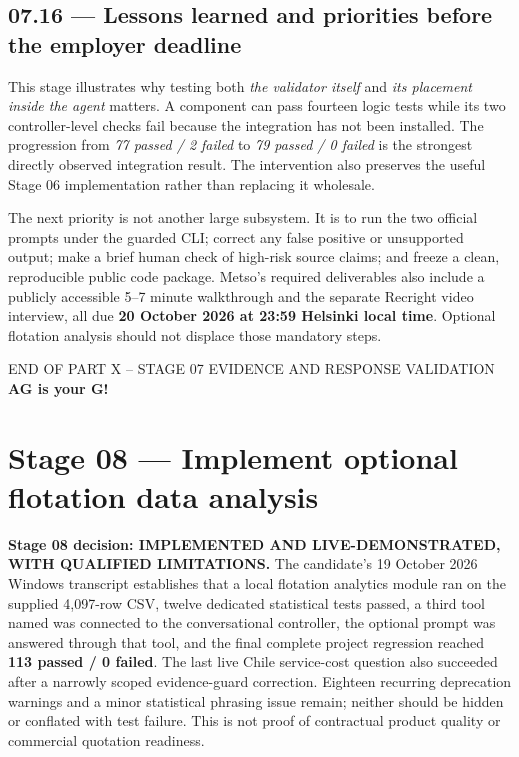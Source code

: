 \documentclass[11pt,a4paper]{article}
\DeclareRobustCommand{\code}[1]{{\ttfamily\small\detokenize{#1}}}
\begin{document}
\subsection{07.16 --- Lessons learned and priorities before the employer deadline}
This stage illustrates why testing both \emph{the validator itself} and \emph{its placement inside the agent} matters. A component can pass fourteen logic tests while its two controller-level checks fail because the integration has not been installed. The progression from \emph{77 passed / 2 failed} to \emph{79 passed / 0 failed} is the strongest directly observed integration result. The intervention also preserves the useful Stage 06 implementation rather than replacing it wholesale.

The next priority is not another large subsystem. It is to run the two official prompts under the guarded CLI; correct any false positive or unsupported output; make a brief human check of high-risk source claims; and freeze a clean, reproducible public code package. Metso's required deliverables also include a publicly accessible 5--7 minute walkthrough and the separate Recright video interview, all due \textbf{20 October 2026 at 23:59 Helsinki local time}. Optional flotation analysis should not displace those mandatory steps.

\vspace{4mm}
\begin{center}
{\sffamily\color{Gray}\footnotesize END OF PART X -- STAGE 07 EVIDENCE AND RESPONSE VALIDATION}\\[2mm]
{\sffamily\bfseries\color{Navy}AG is your G!}
\end{center}


\clearpage
\section{Stage 08 --- Implement optional flotation data analysis}
\label{sec:stage08}
\begin{keybox}
\textbf{Stage 08 decision: IMPLEMENTED AND LIVE-DEMONSTRATED, WITH QUALIFIED LIMITATIONS.}
The candidate's 19 October 2026 Windows transcript establishes that a local flotation analytics module ran on the supplied 4,097-row CSV, twelve dedicated statistical tests passed, a third tool named \code{analyze_flotation} was connected to the conversational controller, the optional prompt was answered through that tool, and the final complete project regression reached \textbf{113 passed / 0 failed}. The last live Chile service-cost question also succeeded after a narrowly scoped evidence-guard correction. Eighteen recurring deprecation warnings and a minor statistical phrasing issue remain; neither should be hidden or conflated with test failure. This is not proof of contractual product quality or commercial quotation readiness.
\end{keybox}
\end{document}
